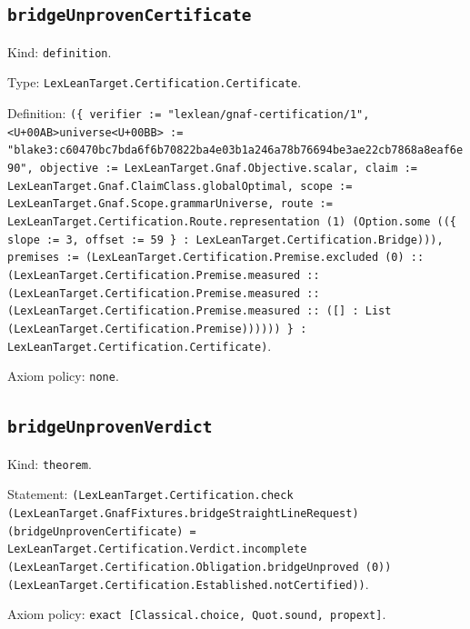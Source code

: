 \documentclass[11pt]{article}
\begin{document}
\subsection*{\texttt{bridgeUnprovenCertificate}}
\noindent Kind: \texttt{definition}.\par
\noindent Type: \texttt{LexLeanTarget.Certification.Certificate}.\par
\noindent Definition: \texttt{(\{ verifier := "lexlean/gnaf-certification/1", <U+00AB>universe<U+00BB> := "blake3:c60470bc7bda6f6b70822ba4e03b1a246a78b76694be3ae22cb7868a8eaf6e90", objective := LexLeanTarget.Gnaf.Objective.scalar, claim := LexLeanTarget.Gnaf.ClaimClass.globalOptimal, scope := LexLeanTarget.Gnaf.Scope.grammarUniverse, route := LexLeanTarget.Certification.Route.representation (1) (Option.some ((\{ slope := 3, offset := 59 \} : LexLeanTarget.Certification.Bridge))), premises := (LexLeanTarget.Certification.Premise.excluded (0) :: (LexLeanTarget.Certification.Premise.measured :: (LexLeanTarget.Certification.Premise.measured :: (LexLeanTarget.Certification.Premise.measured :: ([] : List (LexLeanTarget.Certification.Premise)))))) \} : LexLeanTarget.Certification.Certificate)}.\par
\noindent Axiom policy: \texttt{none}.\par
\subsection*{\texttt{bridgeUnprovenVerdict}}
\noindent Kind: \texttt{theorem}.\par
\noindent Statement: \texttt{(LexLeanTarget.Certification.check (LexLeanTarget.GnafFixtures.bridgeStraightLineRequest) (bridgeUnprovenCertificate) = LexLeanTarget.Certification.Verdict.incomplete (LexLeanTarget.Certification.Obligation.bridgeUnproved (0)) (LexLeanTarget.Certification.Established.notCertified))}.\par
\noindent Axiom policy: \texttt{exact [Classical.choice, Quot.sound, propext]}.\par
\end{document}
